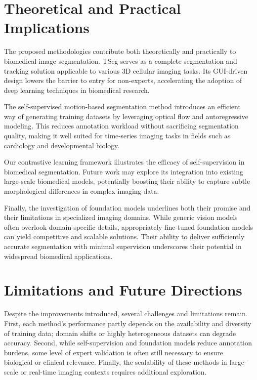 \documentclass[./dissertation.tex]{subfiles}
\begin{document}
\section{Theoretical and Practical Implications}
The proposed methodologies contribute both theoretically and practically to biomedical image segmentation. TSeg serves as a complete segmentation and tracking solution applicable to various 3D cellular imaging tasks. Its GUI-driven design lowers the barrier to entry for non-experts, accelerating the adoption of deep learning techniques in biomedical research.

The self-supervised motion-based segmentation method introduces an efficient way of generating training datasets by leveraging optical flow and autoregressive modeling. This reduces annotation workload without sacrificing segmentation quality, making it well suited for time-series imaging tasks in fields such as cardiology and developmental biology.

Our contrastive learning framework illustrates the efficacy of self-supervision in biomedical segmentation. Future work may explore its integration into existing large-scale biomedical models, potentially boosting their ability to capture subtle morphological differences in complex imaging data.

Finally, the investigation of foundation models underlines both their promise and their limitations in specialized imaging domains. While generic vision models often overlook domain-specific details, appropriately fine-tuned foundation models can yield competitive and scalable solutions. Their ability to deliver sufficiently accurate segmentation with minimal supervision underscores their potential in widespread biomedical applications.

\section{Limitations and Future Directions}
Despite the improvements introduced, several challenges and limitations remain. First, each method’s performance partly depends on the availability and diversity of training data; domain shifts or highly heterogeneous datasets can degrade accuracy. Second, while self-supervision and foundation models reduce annotation burdens, some level of expert validation is often still necessary to ensure biological or clinical relevance. Finally, the scalability of these methods in large-scale or real-time imaging contexts requires additional exploration.
\end{document}
